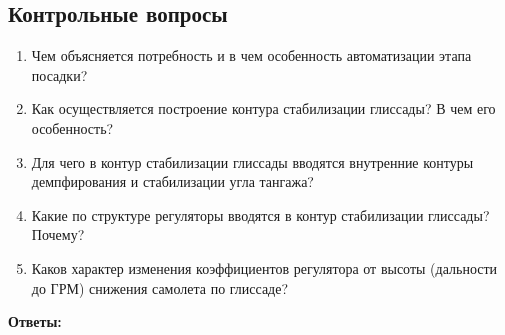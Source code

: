 \begin{center}
    \item \section*{Контрольные вопросы}
\end{center}

\begin{enumerate}
    \item Чем объясняется потребность и в чем особенность автоматизации этапа посадки?
    \item Как осуществляется построение контура стабилизации глиссады? В чем его особенность?
    \item Для чего в контур стабилизации глиссады вводятся внутренние контуры демпфирования и стабилизации угла тангажа?
    \item Какие по структуре регуляторы вводятся в контур стабилизации глиссады? Почему?
    \item Каков характер изменения коэффициентов регулятора от высоты (дальности до ГРМ) снижения самолета по глиссаде?
\end{enumerate}

\textbf{Ответы:}

